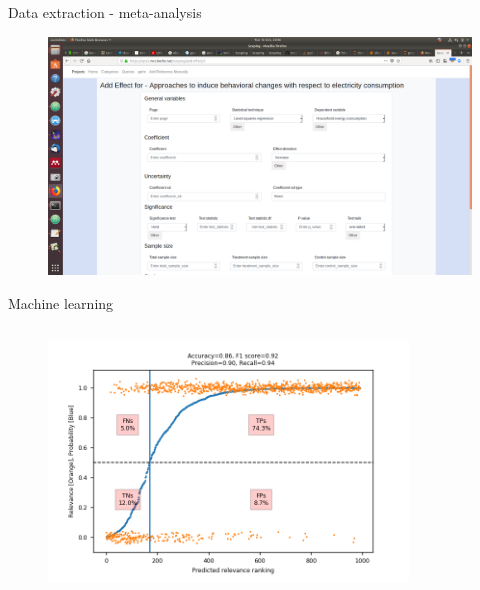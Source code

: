 \documentclass[9pt]{beamer}
\begin{document}
\begin{frame}{Data extraction - meta-analysis}

	\begin{figure}
		\includegraphics[width=\linewidth]{images/meta.png}
	\end{figure}

\end{frame}



\begin{frame}{Machine learning}

\begin{columns}
	\begin{column}{0.5\linewidth}
		\begin{figure}
			\includegraphics[width=\linewidth]{images/example.png}
		\end{figure}
	\end{column}

	\begin{column}{0.5\linewidth}
		\begin{figure}
		\end{figure}
	\end{column}
\end{columns}

\end{frame}
\end{document}
